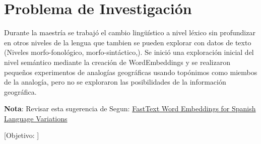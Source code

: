 \chapter{Problema de Investigación}
Durante la maestría se trabajó el cambio lingüístico a nivel léxico
sin profundizar en otros niveles de la lengua que tambien se pueden
explorar con datos de texto (Niveles  morfo-fonológico, morfo-sintáctico,).
Se inició una exploración inicial del nivel semántico mediante la
creación de WordEmbeddings y se realizaron pequeños experimentos
de analogías geográficas usando topónimos como miembos de la analogía,
pero no se exploraron las posibilidades de la información geográfica.


\textbf{Nota}: {\color{red}Revisar esta sugerencia de Segun:} \href{https://github.com/INGEOTEC/RegionalEmbeddings}{FastText Word Embeddings for Spanish Language Variations} 


[Objetivo: ]
